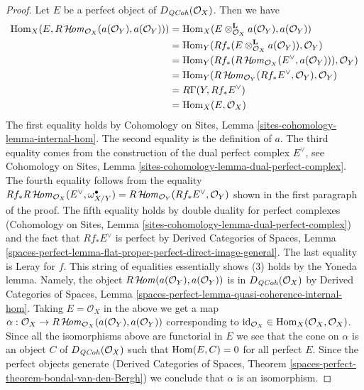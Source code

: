 \begin{proof}
\medskip\noindent
Let $E$ be a perfect object of $D_{\mathit{QCoh}}(\mathcal{O}_X)$. Then
we have
\begin{align*}
\mathop{\mathrm{Hom}}\nolimits_X(E, R\mathop{\mathcal{H}\!\mathit{om}}\nolimits_{\mathcal{O}_X}(a(\mathcal{O}_Y), a(\mathcal{O}_Y)))
& =
\mathop{\mathrm{Hom}}\nolimits_X(E \otimes_{\mathcal{O}_X}^\mathbf{L} a(\mathcal{O}_Y),
a(\mathcal{O}_Y)) \\
& =
\mathop{\mathrm{Hom}}\nolimits_Y(Rf_*(E \otimes_{\mathcal{O}_X}^\mathbf{L} a(\mathcal{O}_Y)),
\mathcal{O}_Y) \\
& =
\mathop{\mathrm{Hom}}\nolimits_Y(Rf_*(R\mathop{\mathcal{H}\!\mathit{om}}\nolimits_{\mathcal{O}_X}(E^\vee, a(\mathcal{O}_Y))),
\mathcal{O}_Y) \\
& =
\mathop{\mathrm{Hom}}\nolimits_Y(R\mathop{\mathcal{H}\!\mathit{om}}\nolimits_{\mathcal{O}_Y}(Rf_*E^\vee, \mathcal{O}_Y),
\mathcal{O}_Y) \\
& =
R\Gamma(Y, Rf_*E^\vee) \\
& =
\mathop{\mathrm{Hom}}\nolimits_X(E, \mathcal{O}_X)
\end{align*}
The first equality holds by Cohomology on Sites, Lemma
\ref{sites-cohomology-lemma-internal-hom}.
The second equality is the definition of $a$.
The third equality comes from the construction of the dual perfect
complex $E^\vee$, see Cohomology on Sites, Lemma
\ref{sites-cohomology-lemma-dual-perfect-complex}.
The fourth equality follows from the equality
$Rf_*R\mathop{\mathcal{H}\!\mathit{om}}\nolimits_{\mathcal{O}_X}(E^\vee, \omega_{X/Y}^\bullet) =
R\mathop{\mathcal{H}\!\mathit{om}}\nolimits_{\mathcal{O}_Y}(Rf_*E^\vee, \mathcal{O}_Y)$
shown in the first paragraph of the proof.
The fifth equality holds by double duality for perfect complexes
(Cohomology on Sites, Lemma
\ref{sites-cohomology-lemma-dual-perfect-complex})
and the fact that $Rf_*E^\vee$ is perfect by
Derived Categories of Spaces, Lemma
\ref{spaces-perfect-lemma-flat-proper-perfect-direct-image-general}.
The last equality is Leray for $f$.
This string of equalities essentially shows (3)
holds by the Yoneda lemma. Namely, the object
$R\mathop{\mathcal{H}\!\mathit{om}}\nolimits(a(\mathcal{O}_Y), a(\mathcal{O}_Y))$
is in $D_{\mathit{QCoh}}(\mathcal{O}_X)$ by Derived Categories of Spaces, Lemma
\ref{spaces-perfect-lemma-quasi-coherence-internal-hom}.
Taking $E = \mathcal{O}_X$ in the above we get a map
$\alpha : \mathcal{O}_X \to
R\mathop{\mathcal{H}\!\mathit{om}}\nolimits_{\mathcal{O}_X}(a(\mathcal{O}_Y), a(\mathcal{O}_Y))$
corresponding to
$\text{id}_{\mathcal{O}_X} \in \mathop{\mathrm{Hom}}\nolimits_X(\mathcal{O}_X, \mathcal{O}_X)$.
Since all the isomorphisms above are functorial in $E$ we
see that the cone on $\alpha$ is an object $C$ of $D_{\mathit{QCoh}}(\mathcal{O}_X)$
such that $\mathop{\mathrm{Hom}}\nolimits(E, C) = 0$ for all perfect $E$.
Since the perfect objects generate
(Derived Categories of Spaces, Theorem
\ref{spaces-perfect-theorem-bondal-van-den-Bergh})
we conclude that $\alpha$ is an isomorphism.
\end{proof}










